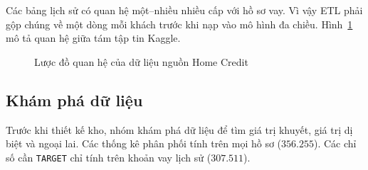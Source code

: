 Các bảng lịch sử có quan hệ một--nhiều nhiều cấp với hồ sơ vay. Vì vậy ETL phải gộp chúng về một dòng mỗi khách trước khi nạp vào mô hình đa chiều. Hình~\ref{fig:hc_description} mô tả quan hệ giữa tám tập tin Kaggle.

\begin{figure}[H]
	\centering
	\caption{Lược đồ quan hệ của dữ liệu nguồn Home Credit}
	\label{fig:hc_description}
\end{figure}

\subsection{Khám phá dữ liệu}
\label{sec:eda}
Trước khi thiết kế kho, nhóm khám phá dữ liệu để tìm giá trị khuyết, giá trị dị biệt và ngoại lai. Các thống kê phân phối tính trên mọi hồ sơ ($356.255$). Các chỉ số cần \texttt{TARGET} chỉ tính trên khoản vay lịch sử ($307.511$).

